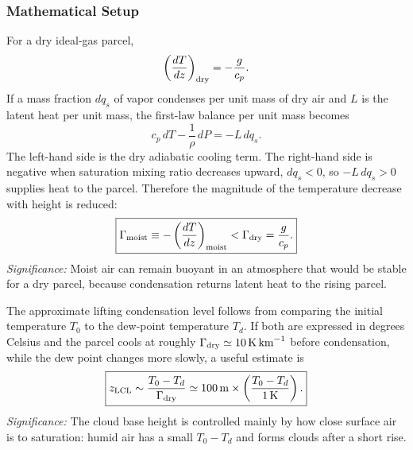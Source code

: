 \subsubsection*{Mathematical Setup}
For a dry ideal-gas parcel,
\begin{equation}
    \left(\frac{dT}{dz}\right)_{\rm dry}
    =
    -\frac{g}{c_p}.
    \label{eq:lec08:dry-lapse}
\end{equation}
If a mass fraction $dq_s$ of vapor condenses per unit mass of dry air and $L$
is the latent heat per unit mass, the first-law balance per unit mass becomes
\begin{equation}
    c_p\,dT-\frac{1}{\rho}\,dP=-L\,dq_s.
    \label{eq:lec08:moist-first-law}
\end{equation}
The left-hand side is the dry adiabatic cooling term. The right-hand side is
negative when saturation mixing ratio decreases upward, $dq_s<0$, so
$-L\,dq_s>0$ supplies heat to the parcel. Therefore the magnitude of the
temperature decrease with height is reduced:
\begin{equation}
    \boxed{
    \Gamma_{\rm moist}
    \equiv
    -\left(\frac{dT}{dz}\right)_{\rm moist}
    <
    \Gamma_{\rm dry}
    =
    \frac{g}{c_p}.
    }
    \label{eq:lec08:moist-lapse-inequality}
\end{equation}
\textit{Significance:} Moist air can remain buoyant in an atmosphere that
would be stable for a dry parcel, because condensation returns latent heat to
the rising parcel.

The approximate lifting condensation level follows from comparing the initial
temperature $T_0$ to the dew-point temperature $T_d$. If both are expressed in
degrees Celsius and the parcel cools at roughly
$\Gamma_{\rm dry}\simeq 10\,\si{K\,km^{-1}}$ before condensation, while the
dew point changes more slowly, a useful estimate is
\begin{equation}
    \boxed{
    z_{\rm LCL}
    \sim
    \frac{T_0-T_d}{\Gamma_{\rm dry}}
    \simeq
    100\,\si{m}\times
    \left(\frac{T_0-T_d}{1\,\si{K}}\right).
    }
    \label{eq:lec08:lcl-estimate}
\end{equation}
\textit{Significance:} The cloud base height is controlled mainly by how close
surface air is to saturation: humid air has a small $T_0-T_d$ and forms clouds
after a short rise.


